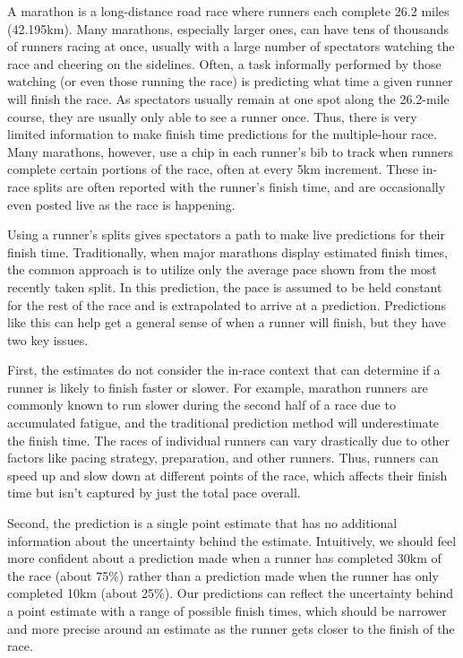 \documentclass[USenglish,twocolumn]{article}
\theoremstyle{dgthm}
\theoremstyle{dgdef}
\begin{document}
A marathon is a long-distance road race where runners each complete 26.2 miles (42.195km). Many marathons, especially larger ones, can have tens of thousands of runners racing at once, usually with a large number of spectators watching the race and cheering on the sidelines. Often, a task informally performed by those watching (or even those running the race) is predicting what time a given runner will finish the race. As spectators usually remain at one spot along the 26.2-mile course, they are usually only able to see a runner once. Thus, there is very limited information to make finish time predictions for the multiple-hour race. Many marathons, however, use a chip in each runner's bib to track when runners complete certain portions of the race, often at every 5km increment. These in-race splits are often reported with the runner's finish time, and are occasionally even posted live as the race is happening.

Using a runner's splits gives spectators a path to make live predictions for their finish time. Traditionally, when major marathons display estimated finish times, the common approach is to utilize only the average pace shown from the most recently taken split. In this prediction, the pace is assumed to be held constant for the rest of the race and is extrapolated to arrive at a prediction. Predictions like this can help get a general sense of when a runner will finish, but they have two key issues.

First, the estimates do not consider the in-race context that can determine if a runner is likely to finish faster or slower. For example, marathon runners are commonly known to run slower during the second half of a race due to accumulated fatigue, and the traditional prediction method will underestimate the finish time. The races of individual runners can vary drastically due to other factors like pacing strategy, preparation, and other runners. Thus, runners can speed up and slow down at different points of the race, which affects their finish time but isn't captured by just the total pace overall. 

Second, the prediction is a single point estimate that has no additional information about the uncertainty behind the estimate. Intuitively, we should feel more confident about a prediction made when a runner has completed 30km of the race (about 75\%) rather than a prediction made when the runner has only completed 10km (about 25\%). Our predictions can reflect the uncertainty behind a point estimate with a range of possible finish times, which should be narrower and more precise around an estimate as the runner gets closer to the finish of the race.
\end{document}
